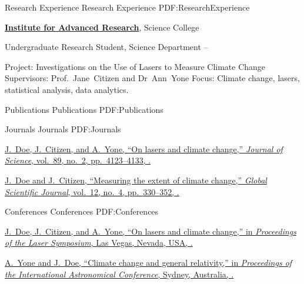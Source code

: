 \documentclass[letterpaper,MMMyyyy,nonstopmode]{simpleresumecv}
\begin{document}
\begin{Body}

\Section
{Research Experience}
{Research Experience}
{PDF:ResearchExperience}

\Entry
\href{http://www.example.com/my-institute}
{\textbf{Institute for Advanced Research}},
Science College

\Gap
\BulletItem
Undergraduate Research Student, Science Department
\hfill
{} --
\begin{Detail}
\SubBulletItem
Project:
Investigations on the Use of Lasers to Measure Climate Change
\SubBulletItem
Supervisors:
Prof.~Jane~Citizen and
Dr~Ann~Yone
\SubBulletItem
Focus:
Climate change, lasers, statistical analysis, data analytics.
\end{Detail}


\Section
{Publications}
{Publications}
{PDF:Publications}

\SubSection
{Journals}
{Journals}
{PDF:Journals}

\begingroup
\renewcommand{\MaxNumberedItem}{[88]}

\BigGap
\NumberedItem{[10]}
\href{http://www.example.com/my-paper-doi-5}
{\underline{J.~Doe}, J.~Citizen, and A.~Yone,
``On lasers and climate change,''
\textit{Journal of Science},
vol.~89,
no.~2,
pp.~4123--4133,
.}

\Gap
\NumberedItem{[1]}
\href{http://www.example.com/my-paper-doi-4}
{\underline{J.~Doe} and J.~Citizen,
``Measuring the extent of climate change,''
\textit{Global Scientific Journal},
vol.~12,
no.~4,
pp.~330--352,
.}

\endgroup

\BigGap
\SubSection
{Conferences}
{Conferences}
{PDF:Conferences}

\begingroup
\renewcommand{\MaxNumberedItem}{[8888]}

\BigGap
\NumberedItem{[1000]}
\href{http://www.example.com/my-paper-doi-3}
{\underline{J.~Doe}, J.~Citizen, and A.~Yone,
``On lasers and climate change,''
in \textit{Proceedings of the Laser Symposium},
Las Vegas, Nevada, USA,
.}

\Gap
\NumberedItem{[100]}
\href{http://www.example.com/my-paper-doi-2}
{A.~Yone and \underline{J.~Doe},
``Climate change and general relativity,''
in \textit{Proceedings of the International Astronomical Conference},
Sydney, Australia,
.}


\end{Body}
\end{document}
